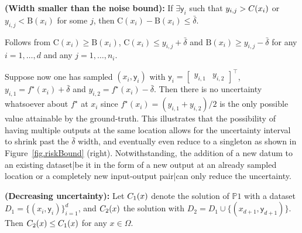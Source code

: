 \begin{proposition} 
	\label{prop.smallWidth}
	{\normalfont \textbf{(Width smaller than the noise bound):}}
	If $\exists \mathsf{y}_i$ such that $y_{i,j} > {\normalfont C}(x_i)$ or $y_{i,j} < \text{B}(x_i)$ for some $j$, then $\text{C}(x_i) - \text{B}(x_i) \leq \bar \delta$.
\end{proposition}
\begin{my_proof}
	Follows from $\text{C}(x_i) \geq \text{B}(x_i)$, $\text{C}(x_i) \leq y_{i,j} + \bar \delta$ and $\text{B}(x_i) \geq y_{i,j} - \bar \delta$ for any $i=1,\dots,d$ and any $j=1,\dots,n_i$. 
\end{my_proof} 

Suppose now one has sampled $(x_i,\mathsf{y}_i)$ with $\mathsf{y}_i = \begin{bmatrix} y_{i,1} & y_{i,2} \end{bmatrix}^\top$, $y_{i,1} = f^\star(x_i) + \bar \delta$ and $y_{i,2} = f^\star(x_i) - \bar \delta$. Then there is no uncertainty whatsoever about $f^\star$ at $x_i$ since $f^\star(x_i) = (y_{i,1} + y_{i,2})/2$ is the only possible value attainable by the ground-truth. This illustrates that the possibility of having multiple outputs at the same location allows for the uncertainty interval to shrink past the $\bar \delta$ width, and eventually even reduce to a singleton as shown in Figure~\ref{fig.riskBound} (right). Notwithstanding, the addition of a new datum to an existing dataset|be it in the form of a new output at an already sampled location or a completely new input-output pair|can only reduce the uncertainty.

\begin{proposition} {\normalfont \textbf{(Decreasing uncertainty):}}
	Let $C_{{\normalfont 1}}(x)$ denote the solution of $\mathds{P}1$ with a dataset $D_1 = \{(x_i,\mathsf{y}_i)\}_{i=1}^{d}$, and $C_{{\normalfont 2}}(x)$ the solution with $D_2 = D_1 \cup \{(x_{d+1},\mathsf{y}_{d+1})\}$. Then $C_{{\normalfont 2}}(x) \leq C_{{\normalfont 1}}(x)$ for any $x \in \Omega$. 
	\label{prop.decreasing}
\end{proposition}

